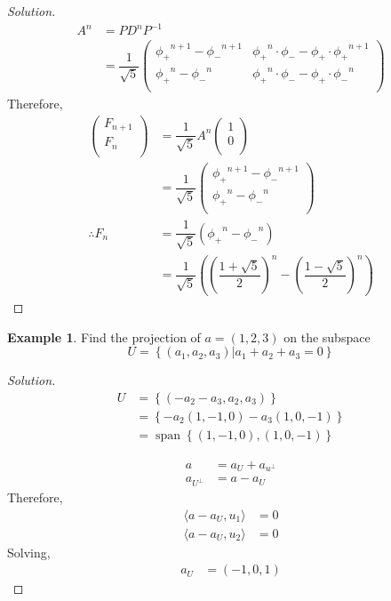 \documentclass[fleqn, a4paper, 12pt]{article}
\theoremstyle{definition}
\newtheorem{example}{Example}
\theoremstyle{theorem}
\newenvironment{solution}
{\begin{proof}[Solution]\let\qed\relax}
	{\end{proof}}
\DeclareMathOperator{\vspan}{\mathrm{span}} %
\begin{document}
\begin{solution}
	\begin{align*}
		A^n &= P D^n P^{-1}\\
		&= \dfrac{1}{\sqrt{5}}
			\begin{pmatrix}
				{\phi_{+}}^{n+1} - {\phi_{-}}^{n+1} & {\phi_{+}}^n \cdot \phi_{-} - \phi_{+} \cdot {\phi_{+}}^{n+1}\\
				{\phi_{+}}^n - {\phi_{-}}^n & {\phi_{+}}^n \cdot \phi_{-} - \phi_{+} \cdot {\phi_{-}}^n\\
			\end{pmatrix}
	\end{align*}
	Therefore,
	\begin{align*}
			\begin{pmatrix}
				F_{n+1}\\
				F_n\\
			\end{pmatrix}
		&= \dfrac{1}{\sqrt{5}} A^n 
			\begin{pmatrix}
				1\\
				0\\
			\end{pmatrix}\\
		&= \dfrac{1}{\sqrt{5}}
			\begin{pmatrix}
				{\phi_{+}}^{n+1} - {\phi_{-}}^{n+1}\\
				{\phi_{+}}^n - {\phi_{-}}^n\\
			\end{pmatrix}\\
		\therefore F_n &= \dfrac{1}{\sqrt{5}} \left( {\phi_{+}}^n - {\phi_{-}}^n \right)\\
		&= \dfrac{1}{\sqrt{5}} \left( \left( \dfrac{1 + \sqrt{5}}{2} \right)^n - \left( \dfrac{1 - \sqrt{5}}{2} \right)^n \right)
	\end{align*}
\end{solution}

\begin{example}
	Find the projection of $a = (1,2,3)$ on the subspace 
	\begin{equation*}
		U = \left\{ (a_1, a_2, a_3) | a_1 + a_2 + a_3 = 0 \right\}
	\end{equation*}
\end{example}

\begin{solution}
	\begin{align*}
		U &= \left\{ (- a_2 - a_3, a_2, a_3) \right\}\\
		&= \left\{ -a_2 (1, -1, 0) - a_3 (1, 0, -1) \right\}\\
		&= \vspan \left\{ (1, -1, 0), (1, 0, -1) \right\}
	\end{align*}
	
	\begin{align*}
		a &= a_U + a_{u^{\perp}}\\
		a_{U^{\perp}} &= a - a_U
	\end{align*}
	Therefore,
	\begin{align*}
		\langle a - a_U, u_1 \rangle &= 0\\
		\langle a - a_U, u_2 \rangle &= 0
	\end{align*}
	Solving,
	\begin{align*}
		a_U &= (-1, 0, 1)
	\end{align*}
\end{solution}
\end{document}
